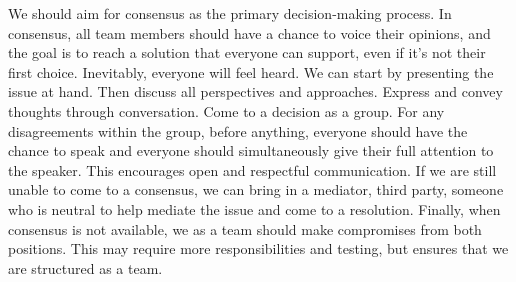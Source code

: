 \documentclass{article}
\begin{document}
We should aim for consensus as the primary decision-making process. In consensus, all team members should have a chance to voice their opinions, and the goal is to reach a solution that everyone can support, even if it’s not their first choice. Inevitably, everyone will feel heard. We can start by presenting the issue at hand. Then discuss all perspectives and approaches. Express and convey thoughts through conversation. Come to a decision as a group.
\newline
\newline
For any disagreements within the group, before anything, everyone should have the chance to speak and everyone should simultaneously give their full attention to the speaker. This encourages open and respectful communication. If we are still unable to come to a consensus, we can bring in a mediator, third party, someone who is neutral to help mediate the issue and come to a resolution. Finally, when consensus is not available, we as a team should make compromises from both positions. This may require more responsibilities and testing, but ensures that we are structured as a team.
\end{document}
